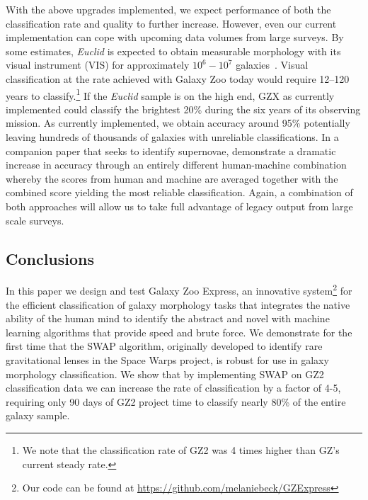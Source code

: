With the above upgrades implemented, we expect performance of both the
classification rate and quality to further increase. However, even our current 
implementation can cope with upcoming data volumes from large surveys. 
By some estimates, \textit{Euclid} is expected to obtain measurable morphology with its visual instrument (VIS) for approximately $10^6 - 10^7$ galaxies~\citep{Euclid}. Visual classification at the rate achieved with Galaxy Zoo today
would require 12--120 years to classify.\footnote{We note that the classification rate of GZ2 was 4 times higher than GZ's current steady rate.}
If the \textit{Euclid} sample is on the high end, GZX as currently implemented
could classify the brightest 20\% during the six years of its observing mission. 
As currently implemented, we obtain accuracy around 95\% potentially leaving
hundreds of thousands of galaxies with unreliable classifications.  
In a companion paper that seeks to identify supernovae, \cite{Wright2017} 
demonstrate a dramatic increase in accuracy through an entirely different human-machine combination whereby the scores from human and machine are averaged together with the combined score yielding the most reliable classification. Again, a combination of both approaches will allow us to take full advantage of legacy output from large scale surveys.


\subsection{Conclusions}

In this paper we design and test Galaxy Zoo Express, an innovative system\footnote{Our code can be found at \url{https://github.com/melaniebeck/GZExpress}} 
for the efficient classification of galaxy morphology tasks that integrates the 
native ability of the human mind to identify the abstract and novel with 
machine learning algorithms that provide speed and brute force.  
We demonstrate for the first time that the 
SWAP algorithm, originally developed to identify rare gravitational lenses in the 
Space Warps project, is robust for use in galaxy morphology classification. 
We show that by implementing
SWAP on GZ2 classification data we can increase the rate of classification by a factor
of 4-5, requiring only 90 days of GZ2 project time to classify nearly 80\% of the
entire galaxy sample. 

